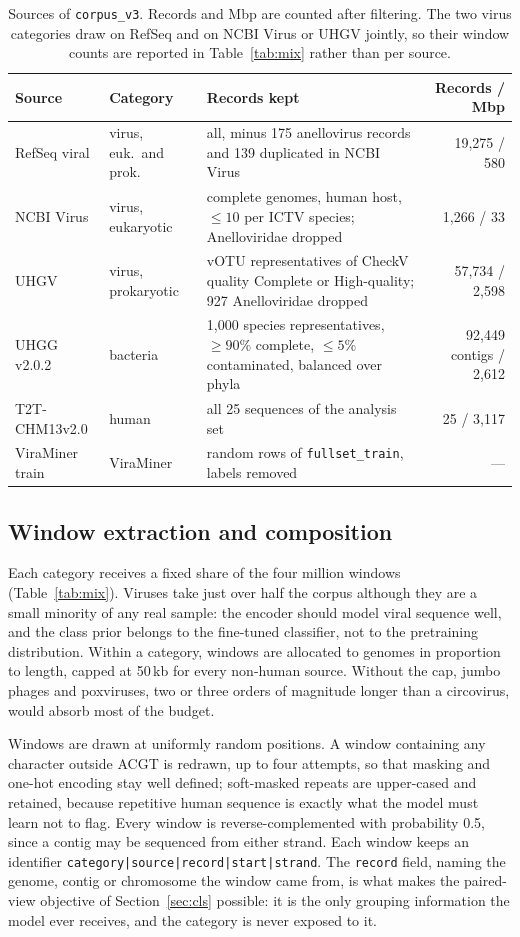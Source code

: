\documentclass[10pt,twocolumn,a4paper]{article}
\begin{document}
\begin{table}[t]
\centering
\caption{Sources of \texttt{corpus\_v3}. Records and Mbp are counted after
filtering. The two virus categories draw on RefSeq and on NCBI Virus or UHGV
jointly, so their window counts are reported in Table~\ref{tab:mix} rather than
per source.}
\label{tab:sources}
\footnotesize
\begin{tabularx}{\textwidth}{llXr}
\toprule
Source & Category & Records kept & Records / Mbp \\
\midrule
RefSeq viral & virus, euk.\ and prok. & all, minus 175 anellovirus records and 139 duplicated in NCBI Virus & 19{,}275 / 580 \\
NCBI Virus & virus, eukaryotic & complete genomes, human host, $\le10$ per ICTV species; Anelloviridae dropped & 1{,}266 / 33 \\
UHGV & virus, prokaryotic & vOTU representatives of CheckV quality Complete or High-quality; 927 Anelloviridae dropped & 57{,}734 / 2{,}598 \\
UHGG v2.0.2 & bacteria & 1{,}000 species representatives, $\ge90\%$ complete, $\le5\%$ contaminated, balanced over phyla & 92{,}449 contigs / 2{,}612 \\
T2T-CHM13v2.0 & human & all 25 sequences of the analysis set & 25 / 3{,}117 \\
ViraMiner train & ViraMiner & random rows of \texttt{fullset\_train}, labels removed & --- \\
\bottomrule
\end{tabularx}
\end{table}

\subsection{Window extraction and composition}

Each category receives a fixed share of the four million windows
(Table~\ref{tab:mix}). Viruses take just over half the corpus although they are a
small minority of any real sample: the encoder should model viral sequence well,
and the class prior belongs to the fine-tuned classifier, not to the pretraining
distribution. Within a category, windows are allocated to genomes in proportion
to length, capped at 50\,kb for every non-human source. Without the cap, jumbo
phages and poxviruses, two or three orders of magnitude longer than a
circovirus, would absorb most of the budget.

Windows are drawn at uniformly random positions. A window containing any
character outside ACGT is redrawn, up to four attempts, so that masking and
one-hot encoding stay well defined; soft-masked repeats are upper-cased and
retained, because repetitive human sequence is exactly what the model must learn
not to flag. Every window is reverse-complemented with probability 0.5, since a
contig may be sequenced from either strand. Each window keeps an identifier
\texttt{category|source|record|start|strand}. The \texttt{record} field, naming
the genome, contig or chromosome the window came from, is what makes the
paired-view objective of Section~\ref{sec:cls} possible: it is the only grouping
information the model ever receives, and the category is never exposed to it.
\end{document}
